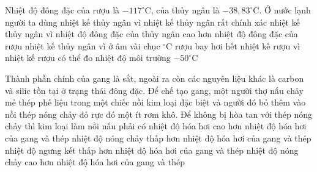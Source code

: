 \begin{ex}
	{\color{red}\footnotesize\ttfamily [L12C1B1-TN-14]}\par %
	Nhiệt độ đông đặc của rượu là $-117^\circ \mathrm{C}$, của thủy ngân là $-38{,}83^\circ \mathrm{C}$. Ở nước lạnh người ta dùng \choice
	{nhiệt kế thủy ngân vì nhiệt kế thủy ngân rất chính xác}
	{nhiệt kế thủy ngân vì nhiệt độ đông đặc của thủy ngân cao hơn nhiệt độ đông đặc của rượu}
	{nhiệt kế thủy ngân vì ở âm vài chục $^\circ \mathrm{C}$ rượu bay hơi hết}
	{\True nhiệt kế rượu vì nhiệt kế rượu có thể đo nhiệt độ môi trường $-50^\circ \mathrm{C}$}
\end{ex}

\begin{ex}
	{\color{red}\footnotesize\ttfamily [L12C1B1-TN-19]}\par %
	Thành phần chính của gang là sắt, ngoài ra còn các nguyên liệu khác là carbon và silic tồn tại ở trạng thái đông đặc. Để chế tạo gang, một người thợ nấu chảy mẻ thép phế liệu trong một chiếc nồi kim loại đặc biệt và người đó bỏ thêm vào nồi thép nóng chảy đỏ rực đó một ít rơm khô. Để không bị hòa tan với thép nóng chảy thì kim loại làm nồi nấu phải có
	\choice
	{nhiệt độ hóa hơi cao hơn nhiệt độ hóa hơi của gang và thép}
	{nhiệt độ nóng chảy thấp hơn nhiệt độ hóa hơi của gang và thép}
	{nhiệt độ ngưng kết thấp hơn nhiệt độ hóa hơi của gang và thép}
	{\True nhiệt độ nóng chảy cao hơn nhiệt độ hóa hơi của gang và thép}
\end{ex}


